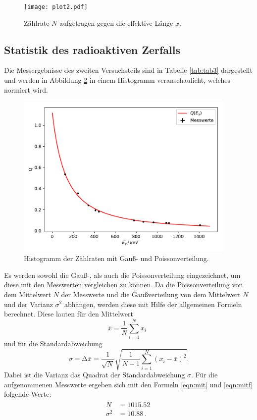 \begin{figure}[H]
  \centering
  \texttt{[image: plot2.pdf]}
  \caption{Zählrate $N$ aufgetragen gegen die effektive Länge $x$.}
  \label{fig:plot2}
\end{figure}


\subsection{Statistik des radioaktiven Zerfalls}

Die Messergebnisse des zweiten Versuchsteils sind in Tabelle \ref{tab:tab3}
dargestellt und werden in Abbildung \ref{fig:plot4} in einem Histogramm
veranschaulicht, welches normiert wird.


\begin{figure}[H]
  \centering
  \includegraphics[height=8cm]{plot4.pdf}
  \caption{Histogramm der Zählraten mit Gauß- und Poissonverteilung.}
  \label{fig:plot4}
\end{figure}

Es werden sowohl die Gauß-, als auch die Poissonverteilung eingezeichnet, um
diese mit den Messwerten vergleichen zu können.
Da die Poissonverteilung von dem Mittelwert $\bar{N}$ der Messwerte und die
Gaußverteilung von dem Mittelwert $\bar{N}$ und der Varianz $\sigma^{2}$ abhängen, werden diese
mit Hilfe der allgemeinen Formeln berechnet. Diese lauten für den Mittelwert
\begin{equation}
  \bar{x} = \frac{1}{N} \sum_{i=1}^{N} x_i \: \:
  \label{eqn:mit}
\end{equation}
und für die Standardabweichung
\begin{equation}
  \sigma=\increment \bar{x} = \frac{1}{\sqrt{N}} \sqrt{ \frac{1}{N-1} \sum_{i=1}^N
  (x_i - \bar{x})^2}.
  \label{eqn:mitf}
\end{equation}
Dabei ist die Varianz das Quadrat der Standardabweichung $\sigma$.
Für die aufgenommenen Messwerte ergeben sich mit den Formeln \ref{eqn:mit} und
\ref{eqn:mitf} folgende Werte:
\begin{align*}
  \bar{N}&=\SI{1015.52}{}\\
  \sigma^{2}&=\SI{10.88}{}.\\
\end{align*}
